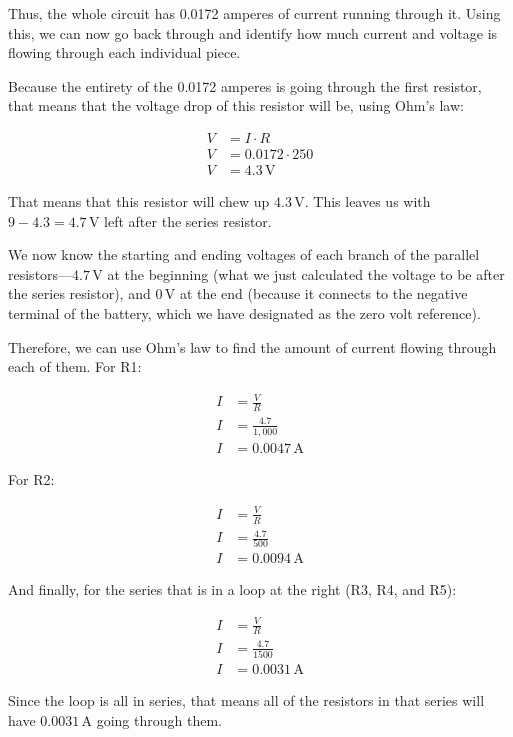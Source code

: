 Thus, the whole circuit has 0.0172 amperes of current running through it.
Using this, we can now go back through and identify how much current and voltage is flowing through each individual piece.

Because the entirety of the 0.0172 amperes is going through the first resistor, that means that the voltage drop of this resistor will be, using Ohm's law:

\begin{align*}
V &= I\cdot R \\
V &= 0.0172 \cdot 250 \\
V &= 4.3\,\si{\volt}
\end{align*}

That means that this resistor will chew up $4.3\,\si{\volt}$.  
This leaves us with $9 - 4.3 = 4.7\,\si{\volt}$ left after the series resistor.

We now know the starting and ending voltages of each branch of the parallel resistors---$4.7\,\si{\volt}$ at the beginning (what we just calculated the voltage to be after the series resistor), and $0\,\si{\volt}$ at the end (because it connects to the negative terminal of the battery, which we have designated as the zero volt reference).

Therefore, we can use Ohm's law to find the amount of current flowing through each of them.
For R1:

\begin{align*}
I &= \frac{V}{R} \\
I &= \frac{4.7}{1,000} \\
I &= 0.0047\,\si{\ampere}
\end{align*}

For R2:

\begin{align*}
I &= \frac{V}{R} \\
I &= \frac{4.7}{500} \\
I &= 0.0094\,\si{\ampere}
\end{align*}

And finally, for the series that is in a loop at the right (R3, R4, and R5):

\begin{align*}
I &= \frac{V}{R} \\
I &= \frac{4.7}{1500} \\
I &= 0.0031\,\si{\ampere}
\end{align*}

Since the loop is all in series, that means all of the resistors in that series will have $0.0031\,\si{\ampere}$ going through them.

